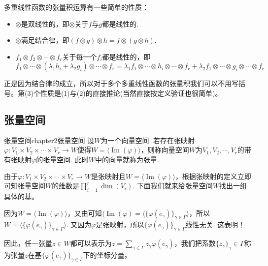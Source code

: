 多重线性函数的张量积运算有一些简单的性质：
\begin{itemize}
	\item[(1)] $\otimes$是双线性的，即$\otimes $关于$f$与$g$都是线性的.
	\item[(2)] $\otimes$满足结合律，即$(f\otimes g)\otimes h=f\otimes (g\otimes h)$.
	\item[(3)] $f_{1}\otimes f_{2}\otimes \cdots\otimes f_{r}$关于每一个$f_{i}$都是线性的，即
	           \[
	            f_{1}\otimes\cdots\otimes \left(\lambda_{1}h_{i}+\lambda_{2}g_{i} \right)\otimes \cdots\otimes f_{r}=\lambda_{1}f_{1}\otimes \cdots\otimes h_{i}\otimes \cdots\otimes f_{r}+\lambda_{2}f_{1}\otimes \cdots\otimes g_{i}\otimes \cdots\otimes f_{r}
	           \]
\end{itemize}
正是因为结合律的成立，所以对于多个多重线性函数的张量积我们可以不用写括号。第(3)个性质是(1)与(2)的直接推论(当然直接按定义验证也很简单)。

\subsection{张量空间}

\begin{mydef}{张量空间}{chapter2张量空间}
	设$W$为一个向量空间. 若存在张映射$\varphi:V_{1}\times V_{2}\times\cdots\times V_{r}\longrightarrow W$使得$W=\langle\operatorname{Im}(\varphi) \rangle$，则称向量空间$W$为$V_{1},V_{2},\cdots,V_{r}$的带有张映射$\varphi$的张量空间. 此时$W$中的向量就称为张量.
\end{mydef}

由于$\varphi:V_{1}\times V_{2}\times\cdots\times V_{r}\longrightarrow W$是张映射且$W=\langle\operatorname{Im}(\varphi) \rangle$，根据张映射的定义立即可知张量空间$W$的维数是$\prod_{i=1}^{r}\operatorname{dim}(V_{i})$. 下面我们就来给张量空间$W$找出一组具体的基。

因为$W=\langle\operatorname{Im}(\varphi) \rangle $，又由可知$\langle\operatorname{Im}(\varphi)= \langle\{\varphi(e_{\gamma}) \}_{\gamma\in \Gamma} \rangle $，所以$W=\langle\{\varphi(e_{\gamma}) \}_{\gamma\in \Gamma} \rangle $. 又因为$\varphi$是张映射，所以$\{\varphi(e_{\gamma}) \}_{\gamma\in \Gamma}$线性无关. 这表明{}！

因此，任一张量$z\in W$都可以表示为$z=\sum_{ \gamma\in \Gamma }z_{\gamma}\varphi(e_{\gamma})$，我们把系数$\{z_{\gamma} \}_\gamma\in \Gamma$称为张量$z$在基$\{\varphi(e_{\gamma}) \}_{\gamma\in \Gamma}$下的坐标分量。

